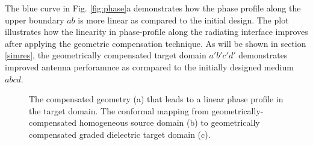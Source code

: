 The blue curve in Fig. \ref{fig:phase}a demonstrates how the phase profile along the upper boundary $ab$ is more linear as compared to the initial design. The plot illustrates how the linearity in phase-profile along the radiating interface improves after applying the geometric compensation technique. As will be shown in section \ref{simres}, the geometrically compensated target domain $a'b'c'd'$ demonstrates improved antenna perforamnce as cormpared to the initially designed medium $abcd$.
\begin{figure} [t!]
\centering
  \noindent
    \hspace*{\fill}%
 \mbox{}
\hspace*{\fill}%

\hspace*{\fill}%
	\noindent
	\mbox{}
\hspace*{\fill}%
  \mbox{}
	  \hspace*{\fill}%
  \caption[The compensated source domain geometry and its transformation to rectangular target domain.] {The compensated geometry (a) that leads to a linear phase profile in the target domain. The conformal mapping from geometrically-compensated homogeneous source domain (b) to geometrically compensated graded dielectric target domain (c).}
\label{fig:LWAcompensation}
\end{figure}


